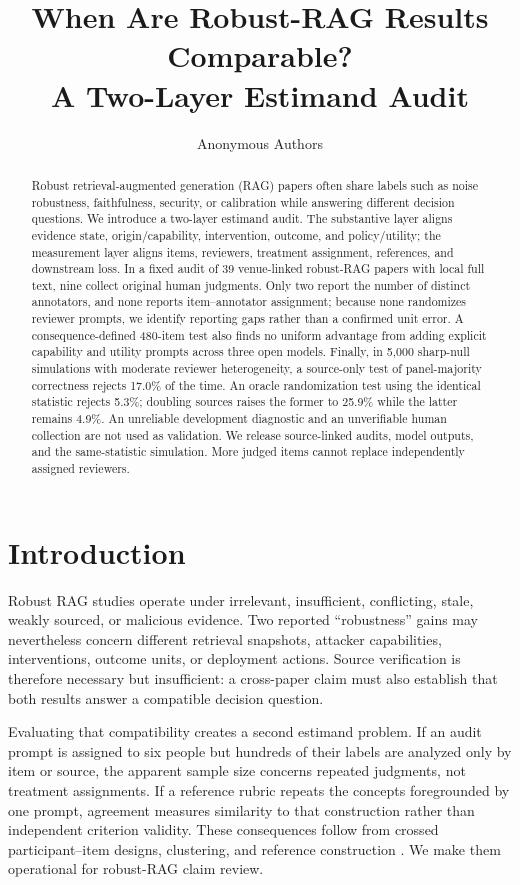 \documentclass[11pt]{article}
\title{When Are Robust-RAG Results Comparable?\\
A Two-Layer Estimand Audit}
\author{Anonymous Authors}
\date{}
\begin{document}
\maketitle

\begin{abstract}
Robust retrieval-augmented generation (RAG) papers often share labels such as
noise robustness, faithfulness, security, or calibration while answering
different decision questions. We introduce a two-layer estimand audit. The
substantive layer aligns evidence state, origin/capability, intervention,
outcome, and policy/utility; the measurement layer aligns items, reviewers,
treatment assignment, references, and downstream loss. In a fixed audit of 39
venue-linked robust-RAG papers with local full text, nine collect original
human judgments. Only two report the number of distinct annotators, and none
reports item--annotator assignment; because none randomizes reviewer prompts,
we identify reporting gaps rather than a confirmed unit error. A
consequence-defined 480-item test also finds no uniform advantage from adding
explicit capability and utility prompts across three open models. Finally, in
5,000 sharp-null simulations with moderate reviewer heterogeneity, a
source-only test of panel-majority correctness rejects 17.0\% of the time. An
oracle randomization test using the identical statistic rejects 5.3\%;
doubling sources raises the former to 25.9\% while the latter remains 4.9\%.
An unreliable development diagnostic and an unverifiable human collection are
not used as validation. We release source-linked audits, model outputs, and
the same-statistic simulation. More judged items cannot replace independently
assigned reviewers.
\end{abstract}

\section{Introduction}

Robust RAG studies operate under irrelevant, insufficient, conflicting, stale,
weakly sourced, or malicious evidence. Two reported ``robustness'' gains may
nevertheless concern different retrieval snapshots, attacker capabilities,
interventions, outcome units, or deployment actions. Source verification is
therefore necessary but insufficient: a cross-paper claim must also establish
that both results answer a compatible decision question.

Evaluating that compatibility creates a second estimand problem. If an audit
prompt is assigned to six people but hundreds of their labels are analyzed
only by item or source, the apparent sample size concerns repeated judgments,
not treatment assignments. If a reference rubric repeats the concepts
foregrounded by one prompt, agreement measures similarity to that
construction rather than independent criterion validity. These consequences
follow from crossed participant--item designs, clustering, and reference
construction \citep{baayen2008crossed,barr2013maximal,abadie2023clustering}.
We make them operational for robust-RAG claim review.
\end{document}
